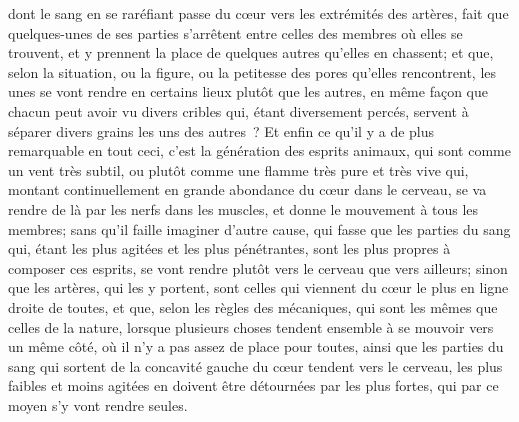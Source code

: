 \documentclass[french,twoside]{book} %
\begin{document}
dont le sang en se raréfiant passe du cœur vers les extrémités des artères, fait que quelques-unes de ses parties s'arrêtent entre celles des membres où elles se trouvent, et y prennent la place de quelques autres qu'elles en chassent; et que, selon la situation, ou la figure, ou la petitesse des pores qu'elles rencontrent, les unes se vont rendre en certains lieux plutôt que les autres, en même façon que chacun peut avoir vu divers cribles qui, étant diversement percés, servent à séparer divers grains les uns des autres ? Et enfin ce qu'il y a de plus remarquable en tout ceci, c'est la génération des esprits animaux, qui sont comme un vent très subtil, ou plutôt comme une flamme très pure et très vive qui, montant continuellement en grande abondance du cœur dans le cerveau, se va rendre de là par les nerfs dans les muscles, et donne le mouvement à tous les membres; sans qu'il faille imaginer d'autre cause, qui fasse que les parties du sang qui, étant les plus agitées et les plus pénétrantes, sont les plus propres à composer ces esprits, se vont rendre plutôt vers le cerveau que vers ailleurs; sinon que les artères, qui les y portent, sont celles qui viennent du cœur le plus en ligne droite de toutes, et que, selon les règles des mécaniques, qui sont les mêmes que celles de la nature, lorsque plusieurs choses tendent ensemble à se mouvoir vers un même côté, où il n'y a pas assez de place pour toutes, ainsi que les parties du sang qui sortent de la concavité gauche du cœur tendent vers le cerveau, les plus faibles et moins agitées en doivent être détournées par les plus fortes, qui par ce moyen s'y vont rendre seules.\par
\par
\end{document}
